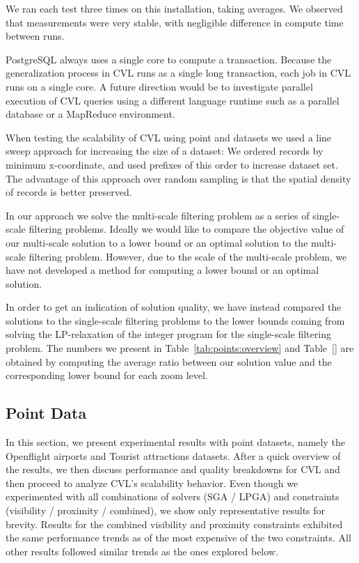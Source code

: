 We ran each test three times on this installation, taking averages. We observed that measurements were very stable, with negligible difference in compute time between runs.

PostgreSQL always uses a single core to compute a transaction. Because the generalization process in CVL runs as a single long transaction, each job in CVL runs on a single core. A future direction would be to investigate parallel execution of CVL queries using a different language runtime such as a parallel database or a MapReduce environment.

When testing the scalability of CVL using point and datasets we used a line sweep approach for increasing the size of a dataset: We ordered records by minimum x-coordinate, and used prefixes of this order to increase dataset set. The advantage of this approach over random sampling is that the spatial density of records is better preserved.

In our approach we solve the multi-scale filtering problem as a series of single-scale filtering problems. Ideally we would like to compare the objective value of our multi-scale solution to a lower bound or an optimal solution to the multi-scale filtering problem. However, due to the scale of the multi-scale problem, we have not developed a method for computing a lower bound or an optimal solution.

In order to get an indication of solution quality, we have instead compared the solutions to the single-scale filtering problems to the lower bounds coming from solving the LP-relaxation of the integer program for the single-scale filtering problem. The numbers we present in Table~\ref{tab:points:overview} and Table~\ref{} are obtained by computing the average ratio between our solution value and the corresponding lower bound for each zoom level. 

\subsection{Point Data}
\label{sec:exp:points}

In this section, we present experimental results with point datasets, namely the Openflight airports and Tourist attractions datasets. After a quick overview of the results, we then discuss performance and quality breakdowns for CVL and then proceed to analyze CVL's scalability behavior. Even though we experimented with all combinations of solvers (SGA / LPGA) and constraints (visibility / proximity / combined), we show only representative results for brevity. Results for the combined visibility and proximity constraints exhibited the same performance trends as of the most expensive of the two constraints. All other results followed similar trends as the ones explored below. 

